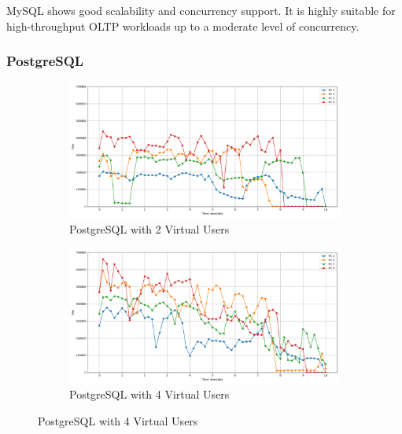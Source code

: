 MySQL shows good scalability and concurrency support. It is highly suitable for high-throughput OLTP workloads up to a moderate level of concurrency.

\subsubsection{PostgreSQL}

\begin{figure}[H]
    \centering
    \hspace*{-1.7cm}
    \begin{subfigure}[b]{0.6\textwidth}
        \centering
        \includegraphics[width=\linewidth]{Images/hdbtcount_PostgreSQL_2.png}
        \caption{PostgreSQL with 2 Virtual Users}
        \label{fig:postgresql-2vu}
    \end{subfigure}%
    \begin{subfigure}[b]{0.6\textwidth}
        \centering
        \includegraphics[width=\linewidth]{Images/hdbtcount_PostgreSQL_4.png}
        \caption{PostgreSQL with 4 Virtual Users}
        \label{fig:postgresql-4vu}
    \end{subfigure}

    \vspace{0.5cm}


\end{figure}
